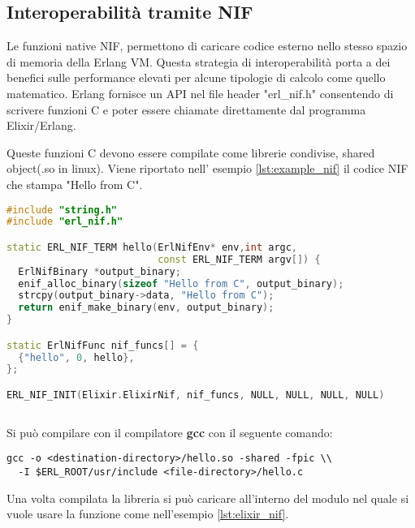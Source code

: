 
\subsection{Interoperabilità tramite NIF}

Le funzioni native NIF, permettono di caricare codice esterno
nello stesso spazio di memoria della Erlang VM. 
Questa strategia di interoperabilità porta a dei benefici
sulle performance elevati per alcune tipologie di calcolo
come quello matematico.
Erlang fornisce un API nel file header
"erl\_nif.h" \cite{Erlanger73:online} consentendo 
di scrivere funzioni C e poter essere chiamate direttamente
dal programma Elixir/Erlang.

Queste funzioni C devono essere compilate come librerie condivise,
shared object(.so in linux). Viene riportato
nell' esempio \ref{lst:example_nif} il codice NIF
che stampa "Hello from C"\cite{adoptingElixirchap7pag126}.

\begin{lstlisting}[language=cpp,captionpos=b,
	caption={Funzione Nif},label={lst:example_nif}]
#include "string.h"
#include "erl_nif.h"

static ERL_NIF_TERM hello(ErlNifEnv* env,int argc,
                          const ERL_NIF_TERM argv[]) {
  ErlNifBinary *output_binary;
  enif_alloc_binary(sizeof "Hello from C", output_binary);
  strcpy(output_binary->data, "Hello from C");
  return enif_make_binary(env, output_binary);
}

static ErlNifFunc nif_funcs[] = {
  {"hello", 0, hello},
};

ERL_NIF_INIT(Elixir.ElixirNif, nif_funcs, NULL, NULL, NULL, NULL)
	
\end{lstlisting}

Si può compilare con il compilatore \textbf{gcc}
con il seguente comando:

\begin{lstlisting}[language=none]
gcc -o <destination-directory>/hello.so -shared -fpic \\
  -I $ERL_ROOT/usr/include <file-directory>/hello.c
\end{lstlisting}

Una volta compilata la libreria si può caricare all'interno del
modulo nel quale si vuole usare la funzione come
nell'esempio \ref{lst:elixir_nif}.

\newpage


